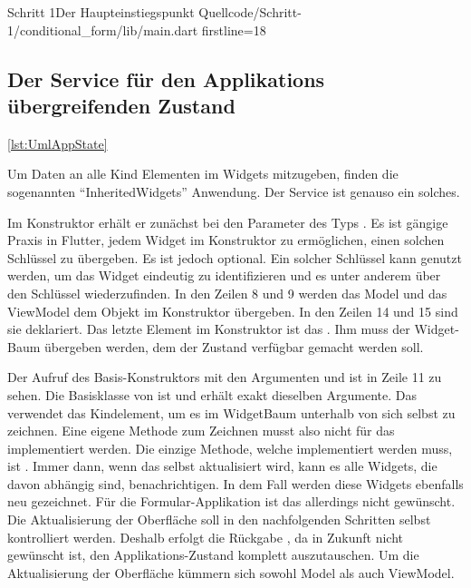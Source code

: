 \begin{alexlisting}{Schritt 1}{Der Haupteinstiegspunkt}
  {Quellcode/Schritt-1/conditional_form/lib/main.dart}
  {firstline=18}
  \label{lst:Schritt1DerHaupteinstiegspunkt}
\end{alexlisting}

\clearpage
\subsection{Der Service für den Applikations übergreifenden Zustand}


\ref{lst:UmlAppState}

Um Daten an alle Kind Elementen im Widgets mitzugeben, finden die sogenannten \enquote{InheritedWidgets} Anwendung. Der Service  \Lst{\ref{lst:Schritt1DerServiceAppState}} ist genauso ein solches.

Im Konstruktor erhält er zunächst bei den Parameter des Typs  . Es ist gängige Praxis in Flutter, jedem Widget im Konstruktor zu ermöglichen, einen solchen Schlüssel zu übergeben. Es ist jedoch optional.  Ein solcher Schlüssel kann genutzt werden, um das Widget eindeutig zu identifizieren und es unter anderem über den Schlüssel wiederzufinden. In den Zeilen 8 und 9 werden das Model und das ViewModel dem Objekt  im Konstruktor übergeben. In den Zeilen 14 und 15 sind sie deklariert. Das letzte Element im Konstruktor ist das . Ihm muss der Widget-Baum übergeben werden, dem der Zustand verfügbar gemacht werden soll.

Der Aufruf des Basis-Konstruktors mit den Argumenten  und  ist in Zeile 11 zu sehen. Die Basisklasse von  ist  und erhält exakt dieselben Argumente.  Das  verwendet das Kindelement, um es im WidgetBaum unterhalb von sich selbst zu zeichnen.  Eine eigene Methode zum Zeichnen musst also nicht für das  implementiert werden. Die einzige Methode, welche implementiert werden muss, ist  . Immer dann, wenn das  selbst aktualisiert wird, kann es alle Widgets, die davon abhängig sind, benachrichtigen.  In dem Fall werden diese  Widgets ebenfalls neu gezeichnet. Für die Formular-Applikation ist das allerdings nicht gewünscht. Die Aktualisierung der Oberfläche soll in den nachfolgenden Schritten selbst kontrolliert werden. Deshalb erfolgt die Rückgabe , da in Zukunft nicht gewünscht ist, den Applikations-Zustand komplett auszutauschen.  Um die  Aktualisierung  der Oberfläche  kümmern sich sowohl Model als auch ViewModel.

